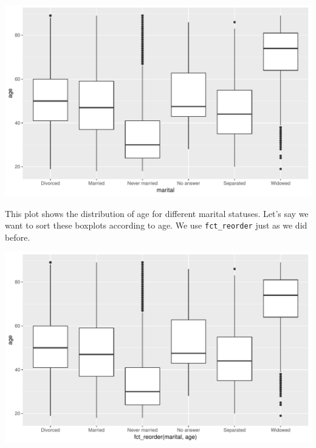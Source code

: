 \documentclass[]{tufte-book}
\newenvironment{Shaded}{}{}
\newcommand{\KeywordTok}[1]{\textcolor[rgb]{0.00,0.44,0.13}{\textbf{#1}}}
\newcommand{\StringTok}[1]{\textcolor[rgb]{0.25,0.44,0.63}{#1}}
\newcommand{\OperatorTok}[1]{\textcolor[rgb]{0.40,0.40,0.40}{#1}}
\newcommand{\NormalTok}[1]{#1}
\begin{document}
\begin{Shaded}
\end{Shaded}

\includegraphics{cleaning_tutorial_files/figure-latex/unnamed-chunk-88-1}

This plot shows the distribution of age for different marital statuses.
Let's say we want to sort these boxplots according to age. We use
\texttt{fct\_reorder} just as we did before.

\begin{Shaded}
\end{Shaded}

\includegraphics{cleaning_tutorial_files/figure-latex/unnamed-chunk-89-1}
\end{document}
